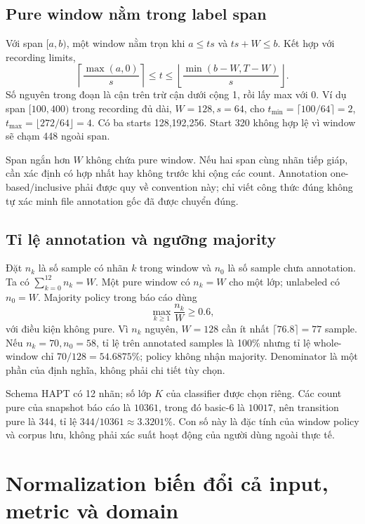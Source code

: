 \documentclass[11pt,a4paper]{article}
\theoremstyle{definition}
\begin{document}
\subsection{Pure window nằm trong label span}
Với span $[a,b)$, một window nằm trọn khi
$a\le ts$ và $ts+W\le b$. Kết hợp với recording limits,
\begin{equation}
\left\lceil\frac{\max(a,0)}s\right\rceil
\le t\le
\left\lfloor\frac{\min(b-W,T-W)}s\right\rfloor.
\end{equation}
Số nguyên trong đoạn là cận trên trừ cận dưới cộng 1, rồi lấy max với 0.
Ví dụ span $[100,400)$ trong recording đủ dài, $W=128,s=64$, cho
$t_{\min}=\lceil100/64\rceil=2$,
$t_{\max}=\lfloor272/64\rfloor=4$. Có ba starts 128,192,256. Start 320
không hợp lệ vì window sẽ chạm 448 ngoài span.

Span ngắn hơn $W$ không chứa pure window. Nếu hai span cùng nhãn tiếp giáp,
cần xác định có hợp nhất hay không trước khi cộng các count. Annotation
one-based/inclusive phải được quy về convention này; chỉ viết công thức
đúng không tự xác minh file annotation gốc đã được chuyển đúng.

\subsection{Tỉ lệ annotation và ngưỡng majority}
Đặt $n_k$ là số sample có nhãn $k$ trong window và $n_0$ là số sample chưa
annotation. Ta có $\sum_{k=0}^{12}n_k=W$. Một pure window có $n_k=W$ cho
một lớp; unlabeled có $n_0=W$. Majority policy trong báo cáo dùng
\begin{equation}
\max_{k\ge1}\frac{n_k}{W}\ge0.6,
\end{equation}
với điều kiện không pure. Vì $n_k$ nguyên, $W=128$ cần ít nhất
$\lceil76.8\rceil=77$ sample. Nếu $n_k=70,n_0=58$, tỉ lệ trên annotated
samples là 100\% nhưng tỉ lệ whole-window chỉ $70/128=54.6875\%$; policy
không nhận majority. Denominator là một phần của định nghĩa, không phải
chi tiết tùy chọn.

Schema HAPT có 12 nhãn; số lớp $K$ của classifier được chọn riêng. Các
count pure của snapshot báo cáo là $10361$, trong đó basic-6 là $10017$,
nên transition pure là $344$, tỉ lệ $344/10361\approx3.3201\%$. Con số này
là đặc tính của window policy và corpus lưu, không phải xác suất hoạt động
của người dùng ngoài thực tế.

\section{Normalization biến đổi cả input, metric và domain}
\end{document}
